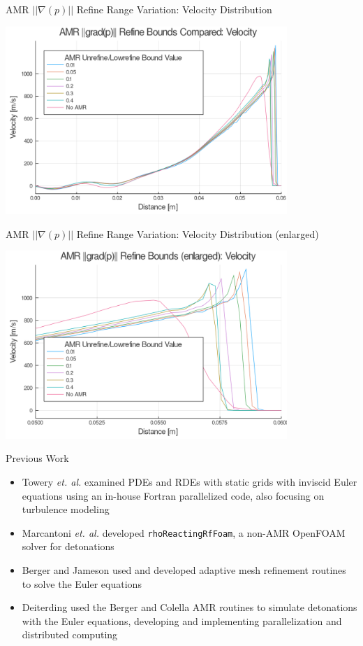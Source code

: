 \begin{frame}{AMR $|| \nabla (p)||$ Refine Range Variation: Velocity Distribution}
\begin{center}
\includegraphics[width=0.8\textwidth]{../figs/amrfigs/amr_refinebounds/u.png}
\end{center}
\end{frame}

\begin{frame}{AMR $|| \nabla (p)||$ Refine Range Variation: Velocity Distribution (enlarged)}
\begin{center}
\includegraphics[width=0.8\textwidth]{../figs/amrfigs/amr_refinebounds/ue.png}
\end{center}
\end{frame}

\begin{frame}{Previous Work}
\begin{itemize}
\item Towery \textit{et. al.} \cite{towery1} examined PDEs and RDEs with static grids with inviscid Euler equations using an in-house Fortran parallelized code, also focusing on turbulence modeling 
\item Marcantoni \textit{et. al.} \cite{marcantoni} developed \texttt{rhoReactingRfFoam}, a non-AMR OpenFOAM solver for detonations 
\item Berger and Jameson \cite{berger1985} used and developed adaptive mesh refinement routines to solve the Euler equations 
\item Deiterding \cite{deiterding} used the Berger and Colella \cite{berger1989} AMR routines to simulate detonations with the Euler equations, developing and implementing parallelization and distributed computing 
\end{itemize}
\end{frame}

